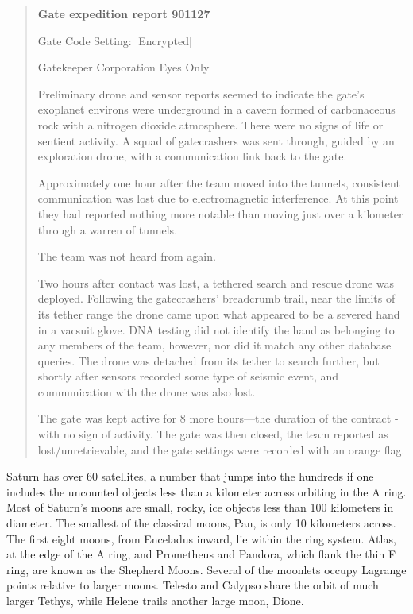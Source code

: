 \begin{quotation} \textbf{Gate expedition report 901127} 

Gate Code Setting: [Encrypted] 

Gatekeeper Corporation Eyes Only 

Preliminary drone and sensor reports seemed to indicate the gate’s exoplanet environs were underground in a cavern formed of carbonaceous rock with a nitrogen dioxide atmosphere. There were no signs of life or sentient activity. A squad of gatecrashers was sent through, guided by an exploration drone, with a communication link back to the gate. 

Approximately one hour after the team moved into the tunnels, consistent communication was lost due to electromagnetic interference. At this point they had reported nothing more notable than moving just over a kilometer through a warren of tunnels. 

The team was not heard from again. 

Two hours after contact was lost, a tethered search and rescue drone was deployed. Following the gatecrashers’ breadcrumb trail, near the limits of its tether range the drone came upon what appeared to be a severed hand in a vacsuit glove. DNA testing did not identify the hand as belonging to any members of the team, however, nor did it match any other database queries. The drone was detached from its tether to search further, but shortly after sensors recorded some type of seismic event, and communication with the drone was also lost. 

The gate was kept active for 8 more hours—the duration of the contract - with no sign of activity. The gate was then closed, the team reported as lost/unretrievable, and the gate settings were recorded with an orange flag. \end{quotation} 





Saturn has over 60 satellites, a number that jumps into the hundreds if one includes the uncounted objects less than a kilometer across orbiting in the A ring. Most of Saturn’s moons are small, rocky, ice objects less than 100 kilometers in diameter. The smallest of the classical moons, Pan, is only 10 kilometers across. The first eight moons, from Enceladus inward, lie within the ring system. Atlas, at the edge of the A ring, and Prometheus and Pandora, which flank the thin F ring, are known as the Shepherd Moons. Several of the moonlets occupy Lagrange points relative to larger moons. Telesto and Calypso share the orbit of much larger Tethys, while Helene trails another large moon, Dione. 

